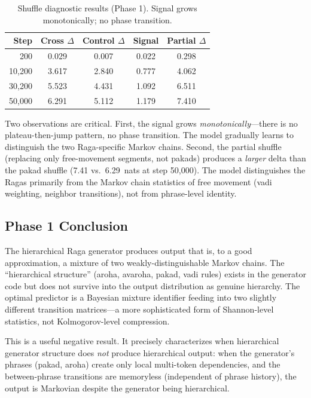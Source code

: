 \documentclass[11pt,a4paper]{article}
\begin{document}
\begin{table}[H]
\centering
\caption{Shuffle diagnostic results (Phase 1). Signal grows monotonically; no phase transition.}
\label{tab:phase1_shuffle}
\begin{tabular}{rcccc}
\toprule
Step & Cross $\Delta$ & Control $\Delta$ & Signal & Partial $\Delta$ \\
\midrule
200 & 0.029 & 0.007 & 0.022 & 0.298 \\
10,200 & 3.617 & 2.840 & 0.777 & 4.062 \\
30,200 & 5.523 & 4.431 & 1.092 & 6.511 \\
50,000 & 6.291 & 5.112 & 1.179 & 7.410 \\
\bottomrule
\end{tabular}
\end{table}

Two observations are critical. First, the signal grows \emph{monotonically}---there is no plateau-then-jump pattern, no phase transition. The model gradually learns to distinguish the two Raga-specific Markov chains. Second, the partial shuffle (replacing only free-movement segments, not pakads) produces a \emph{larger} delta than the pakad shuffle (7.41 vs.\ 6.29~nats at step 50,000). The model distinguishes the Ragas primarily from the Markov chain statistics of free movement (vadi weighting, neighbor transitions), not from phrase-level identity.

\subsection{Phase 1 Conclusion}

The hierarchical Raga generator produces output that is, to a good approximation, a mixture of two weakly-distinguishable Markov chains. The ``hierarchical structure'' (aroha, avaroha, pakad, vadi rules) exists in the generator code but does not survive into the output distribution as genuine hierarchy. The optimal predictor is a Bayesian mixture identifier feeding into two slightly different transition matrices---a more sophisticated form of Shannon-level statistics, not Kolmogorov-level compression.

This is a useful negative result. It precisely characterizes when hierarchical generator structure does \emph{not} produce hierarchical output: when the generator's phrases (pakad, aroha) create only local multi-token dependencies, and the between-phrase transitions are memoryless (independent of phrase history), the output is Markovian despite the generator being hierarchical.
\end{document}
